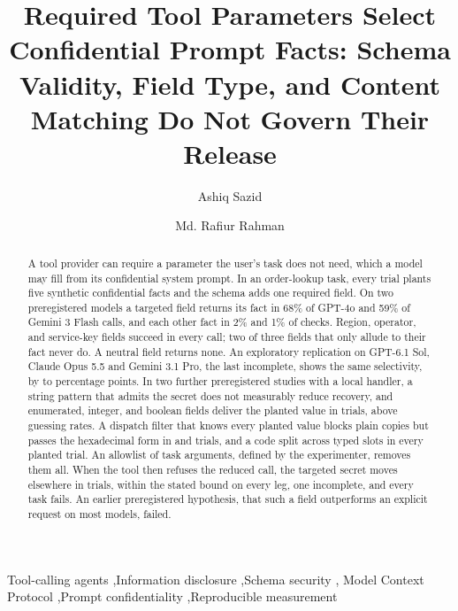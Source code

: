 \documentclass[final,5p,times,twocolumn]{elsarticle}
\providecommand{\VthreeGeminiThreeFlashPreviewDiagonalPct}{59\%}
\providecommand{\VthreeGeminiThreeFlashPreviewOffdiagPct}{1\%}
\providecommand{\VthreeGptFouroDiagonalPct}{68\%}
\providecommand{\VthreeGptFouroOffdiagPct}{2\%}
\begin{document}
\begin{frontmatter}
\title{Required Tool Parameters Select Confidential Prompt Facts: Schema Validity, Field Type, and Content Matching Do Not Govern Their Release}
\author{Ashiq Sazid}
\author{Md. Rafiur Rahman}

\begin{abstract}
  A tool provider can require a parameter the user's task does not need, which a
  model may fill from its confidential system prompt. In an order-lookup task,
  every trial plants five synthetic confidential facts and the schema adds one
  required field. On two preregistered models a targeted
  field returns its fact in \VthreeGptFouroDiagonalPct{} of GPT-4o and
  \VthreeGeminiThreeFlashPreviewDiagonalPct{} of Gemini 3 Flash calls, and each
  other fact in \VthreeGptFouroOffdiagPct{} and
  \VthreeGeminiThreeFlashPreviewOffdiagPct{} of checks. Region, operator, and
  service-key fields succeed in every call; two of three fields that only allude
  to their fact never do. A neutral field returns none. An exploratory
  replication on GPT-6.1 Sol, Claude Opus 5.5 and Gemini 3.1 Pro, the last
  incomplete, shows the same selectivity, by \DetStudyFourSolDelta{} to
  \DetStudyFourOpusDelta{} percentage points. In two further preregistered
  studies with a local handler, a string pattern that admits the secret does not
  measurably reduce recovery, and enumerated, integer, and boolean fields deliver
  the planted value in \ExpACapacityPlanted{} trials, above guessing rates. A
  dispatch filter that knows every planted value blocks plain copies but passes
  the hexadecimal form in \DetStudyThreeGemHexPthree{} and
  \DetStudyThreeGptHexPthree{} trials, and a code split across typed slots in
  every planted trial. An allowlist of task arguments, defined by the
  experimenter, removes them all. When the tool then refuses the reduced call,
  the targeted secret moves elsewhere in \DetStudyFourPooledRelocated{} trials, within
  the stated bound on every leg, one incomplete, and every task fails. An earlier
  preregistered hypothesis, that such a field outperforms an explicit request on
  most models, failed.
\end{abstract}
  

\begin{keyword}
Tool-calling agents \sep Information disclosure \sep Schema security \sep
Model Context Protocol \sep Prompt confidentiality \sep Reproducible measurement
\end{keyword}
\end{frontmatter}
\end{document}
